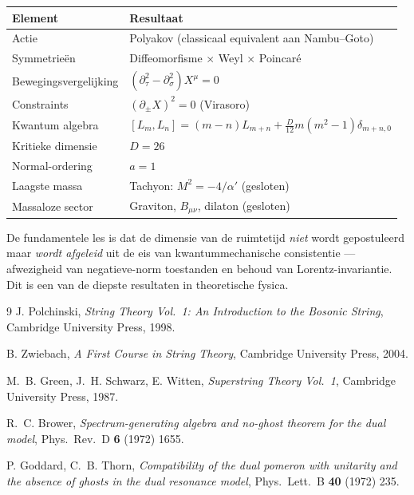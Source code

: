 \documentclass[12pt,a4paper]{article}
\begin{document}
        \begin{center}
            \begin{tabular}{ll}
                \hline
                \textbf{Element} & \textbf{Resultaat} \\
                \hline
                Actie & Polyakov (classicaal equivalent aan Nambu--Goto) \\
                Symmetrie\"en & Diffeomorfisme $\times$ Weyl $\times$ Poincar\'e \\
                Bewegingsvergelijking & $(\partial_\tau^2 - \partial_\sigma^2)X^\mu = 0$ \\
                Constraints & $(\partial_\pm X)^2 = 0$ (Virasoro) \\
                Kwantum algebra & $[L_m,L_n] = (m-n)L_{m+n} + \frac{D}{12}m(m^2-1)\delta_{m+n,0}$ \\
                Kritieke dimensie & $D = 26$ \\
                Normal-ordering & $a = 1$ \\
                Laagste massa & Tachyon: $M^2 = -4/\alpha'$ (gesloten) \\
                Massaloze sector & Graviton, $B_{\mu\nu}$, dilaton (gesloten) \\
                \hline
            \end{tabular}
        \end{center}

        De fundamentele les is dat de dimensie van de ruimtetijd \emph{niet} wordt gepostuleerd maar \emph{wordt afgeleid} uit de eis van kwantummechanische consistentie --- afwezigheid van negatieve-norm toestanden en behoud van Lorentz-invariantie. Dit is een van de diepste resultaten in theoretische fysica.

        \begin{thebibliography}{9}
            J. Polchinski, \textit{String Theory Vol.\ 1: An Introduction to the Bosonic String}, Cambridge University Press, 1998.

            B. Zwiebach, \textit{A First Course in String Theory}, Cambridge University Press, 2004.

            M.~B. Green, J.~H. Schwarz, E. Witten, \textit{Superstring Theory Vol.\ 1}, Cambridge University Press, 1987.

            R.~C. Brower, \textit{Spectrum-generating algebra and no-ghost theorem for the dual model}, Phys.\ Rev.\ D \textbf{6} (1972) 1655.

            P. Goddard, C.~B. Thorn, \textit{Compatibility of the dual pomeron with unitarity and the absence of ghosts in the dual resonance model}, Phys.\ Lett.\ B \textbf{40} (1972) 235.
        \end{thebibliography}
\end{document}
